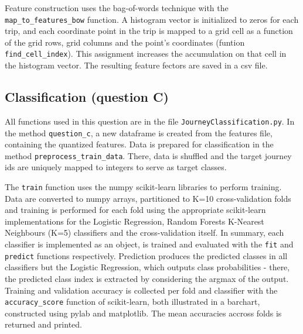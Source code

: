 \documentclass[12pt]{article}
\begin{document}
  Feature construction uses the bag-of-words technique with the \texttt{map\_to\_features\_bow} function. A histogram vector is
  initialized to zeros for each trip, and each coordinate point in the trip is 
  mapped to a grid cell as a function of the grid rows, grid columns and the
  point's coordinates (funtion \texttt{find\_cell\_index}). This assignment increases the accumulation on that
  cell in the histogram vector. The resulting feature fectors are saved in a csv file.

	\subsection{Classification (question C)}
 All functions used in this question are in the file \texttt{JourneyClassification.py}. 
	In the method \texttt{question\_c}, a new dataframe is created from the
  features file, containing the quantized features.
  Data is prepared for classification in the method
  \texttt{preprocess\_train\_data}. There, data is shuffled and the target
  journey ids are uniquely mapped to integers to serve as target classes.

  The \texttt{train} function uses the numpy scikit-learn libraries to perform training.
  Data are converted to numpy arrays, partitioned to K=10 cross-validation folds
  and training is performed for each fold using the appropriate scikit-learn
  implementations for the Logistic Regression, Random Forests K-Nearest Neighbours (K=5)
  classifiers and the cross-validation itself. In summary, each classifier is
  implemented as an object, is trained and evaluated with the \texttt{fit} and
  \texttt{predict} functions respectively. Prediction produces the predicted
  classes in all classifiers but the Logistic Regression, which outputs class
  probabilities - there, the predicted class index is extracted by considering
  the argmax of the output. Training and validation accuracy
  is collected per fold and classifier with the \texttt{accuracy\_score} function
  of scikit-learn, both illustrated in a barchart, constructed using
  pylab and matplotlib. The mean accuracies accross folds is returned and printed.
\end{document}
